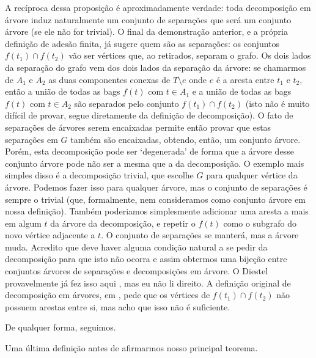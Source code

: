 \documentclass[11pt]{article}
\theoremstyle{definition}
\theoremstyle{definition}
\theoremstyle{definition}
\theoremstyle{definition}
\theoremstyle{definition}
\theoremstyle{definition}
\theoremstyle{definition}
\theoremstyle{definition}
\theoremstyle{definition}
\theoremstyle{definition}
\theoremstyle{definition}
\theoremstyle{definition}
\theoremstyle{definition}
\begin{document}
A recíproca dessa proposição é aproximadamente verdade: toda decomposição em árvore induz naturalmente um conjunto de separações que será um conjunto árvore (se ele não for trivial). O final da demonstração anterior, e a própria definição de adesão finita, já sugere quem são as separações: os conjuntos $f(t_1) \cap f(t_2)$ vão ser vértices que, ao retirados, separam o grafo. Os dois lados da separação do grafo vem dos dois lados da separação da árvore: se chamarmos de $A_1$ e $A_2$ as duas componentes conexas de $T \setminus e$ onde $e$ é a aresta entre $t_1$ e $t_2$, então a união de todas as bags $f(t)$ com $t \in A_1$ e a união de todas as bags $f(t)$ com $t \in A_2$ são separados pelo conjunto $f(t_1) \cap f(t_2)$ (isto não é muito difícil de provar, segue diretamente da definição de decomposição). O fato de separações de árvores serem encaixadas permite então provar que estas separações em $G$ também são encaixadas, obtendo, então, um conjunto árvore. Porém, esta decomposição pode ser `degenerada' de forma que a árvore desse conjunto árvore pode não ser a mesma que a da decomposição. O exemplo mais simples disso é a decomposição trivial, que escolhe $G$ para qualquer vértice da árvore. Podemos fazer isso para qualquer árvore, mas o conjunto de separações é sempre o trivial (que, formalmente, nem consideramos como conjunto árvore em nossa definição). Também poderiamos simplesmente adicionar uma aresta a mais em algum $t$ da árvore da decomposição, e repetir o $f(t)$ como o subgrafo do novo vértice adjacente a $t$. O conjunto de separações se manterá, mas a árvore muda. Acredito que deve haver alguma condição natural a se pedir da decomposição para que isto não ocorra e assim obtermos uma bijeção entre conjuntos árvores de separações e decomposições em árvore. O Diestel provavelmente já fez isso aqui \cite{diesteltreesets}, mas eu não li direito. A definição original de decomposição em árvores, em \cite{original}, pede que os vértices de $f(t_1) \cap f(t_2)$ não possuem arestas entre si, mas acho que isso não é suficiente.

De qualquer forma, seguimos.

Uma última definição antes de afirmarmos nosso principal teorema.
\end{document}
